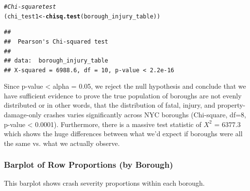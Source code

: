 \documentclass[10pt]{article}\usepackage[]{graphicx}\usepackage[]{xcolor}
\makeatletter
\newcommand{\hlcom}[1]{\textcolor[rgb]{0.678,0.584,0.686}{\textit{#1}}}%
\newcommand{\hldef}[1]{\textcolor[rgb]{0.345,0.345,0.345}{#1}}%
\newcommand{\hlkwb}[1]{\textcolor[rgb]{0.69,0.353,0.396}{#1}}%
\newcommand{\hlkwd}[1]{\textcolor[rgb]{0.737,0.353,0.396}{\textbf{#1}}}%
\newenvironment{kframe}{%
 \def\at@end@of@kframe{}%
 \ifinner\ifhmode%
  \def\at@end@of@kframe{\end{minipage}}%
  \begin{minipage}{\columnwidth}%
 \fi\fi%
 \def\FrameCommand##1{\hskip\@totalleftmargin \hskip-\fboxsep
 \colorbox{shadecolor}{##1}\hskip-\fboxsep
     \hskip-\linewidth \hskip-\@totalleftmargin \hskip\columnwidth}%
 \MakeFramed {\advance\hsize-\width
   \@totalleftmargin\z@ \linewidth\hsize
   \@setminipage}}%
 {\par\unskip\endMakeFramed%
 \at@end@of@kframe}
\newenvironment{knitrout}{}{} %
\makeatother
\begin{document}
\begin{knitrout}
\color{fgcolor}\begin{kframe}
\begin{alltt}
\hlcom{# Chi-square test}
\hldef{(chi_test1} \hlkwb{<-} \hlkwd{chisq.test}\hldef{(borough_injury_table))}
\end{alltt}
\begin{verbatim}
## 
## 	Pearson's Chi-squared test
## 
## data:  borough_injury_table
## X-squared = 6988.6, df = 10, p-value < 2.2e-16
\end{verbatim}
\end{kframe}
\end{knitrout}

Since p-value < alpha = 0.05, we reject the null hypothesis and conclude that we have sufficient evidence to prove the true population of boroughs are not evenly distributed or in other words, that the distribution of fatal, injury, and property-damage-only crashes varies significantly across NYC boroughs (Chi-square, df=8, p-value < 0.0001). Furthermore, there is a massive test statistic of $X^2$ = 6377.3 which shows the huge differences between what we'd expect if boroughs were all the same vs. what we actually observe.


\subsubsection{Barplot of Row Proportions (by Borough)}
This barplot shows crash severity proportions within each borough.
\end{document}
